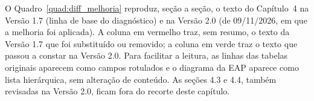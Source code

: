 O Quadro~\ref{quad:diff_melhoria} reproduz, seção a seção, o texto do Capítulo~4 na Versão 1.7 (linha de base do diagnóstico) e na Versão 2.0 (de 09/11/2026, em que a melhoria foi aplicada). A coluna em vermelho traz, sem resumo, o texto da Versão 1.7 que foi substituído ou removido; a coluna em verde traz o texto que passou a constar na Versão 2.0. Para facilitar a leitura, as linhas das tabelas originais aparecem como campos rotulados e o diagrama da EAP aparece como lista hierárquica, sem alteração de conteúdo. As seções 4.3 e 4.4, também revisadas na Versão 2.0, ficam fora do recorte deste capítulo.


